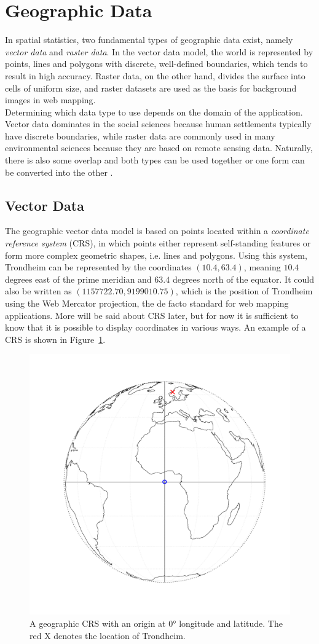 \section{Geographic Data}
In spatial statistics, two fundamental types of geographic data exist, namely \textit{vector data} and \textit{raster data}. In the vector data model, the world is represented by points, lines and polygons with discrete, well-defined boundaries, which tends to result in high accuracy. Raster data, on the other hand, divides the surface into cells of uniform size, and raster datasets are used as the basis for background images in web mapping. \\
Determining which data type to use depends on the domain of the application. Vector data dominates in the social sciences because human settlements typically have discrete boundaries, while raster data are commonly used in many environmental sciences because they are based on remote sensing data. Naturally, there is also some overlap and both types can be used together or one form can be converted into the other \autocite[][]{lovelace2019geocomputation}.
\subsection{Vector Data}
The geographic vector data model is based on points located within a \textit{coordinate reference system} (CRS), in which points either represent self-standing features or form more complex geometric shapes, i.e. lines and polygons. Using this system, Trondheim can be represented by the coordinates $\left(10.4, 63.4\right)$, meaning $10.4$ degrees east of the prime meridian and $63.4$ degrees north of the equator. It could also be written as $\left(1157722.70, 9199010.75\right)$, which is the position of Trondheim using the Web Mercator projection, the de facto standard for web mapping applications. More will be said about CRS later, but for now it is sufficient to know that it is possible to display coordinates in various ways. An example of a CRS is shown in Figure~\ref{fig:globe}.
\begin{figure}[H]
   \centering
       \includegraphics[page=1,width=.7\textwidth]{globe.pdf}
 \caption{A geographic CRS with an origin at 0° longitude and latitude. The red X denotes the location of Trondheim.}
 \label{fig:globe}
\end{figure}
